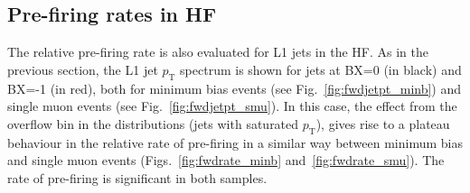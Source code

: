 \documentclass[11pt]{cmspaperpdf}
\newcommand{\pt}{\ensuremath{p_{\mathrm{T}}}\xspace}
\begin{document}
\subsection{Pre-firing rates in HF}
\label{sec:rates_hf}

The relative pre-firing rate is also evaluated for L1 jets in the HF. As in the previous section, the L1 jet \pt spectrum is shown for jets at BX=0 (in black) and BX=-1 (in red), both for minimum bias events (see Fig.~\ref{fig:fwdjetpt_minb}) and single muon events (see Fig.~\ref{fig:fwdjetpt_smu}). In this case, the effect from the overflow bin in the distributions (jets with saturated \pt), gives rise to a plateau behaviour in the relative rate of pre-firing in a similar way between minimum bias and single muon events (Figs.~\ref{fig:fwdrate_minb} and~\ref{fig:fwdrate_smu}). The rate of pre-firing is significant in both samples.
\end{document}

